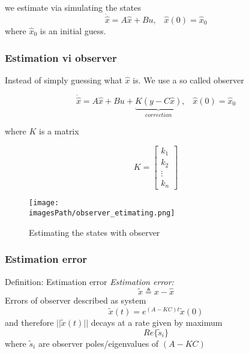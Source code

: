 \documentclass{article}
\newcommand{\imagesPath}{images}
\begin{document}
we estimate via simulating the states
\begin{equation*}
    \dot{\hat{x}} = A\hat{x} + Bu, \;\;\; \hat{x}(0) = \hat{x}_0
\end{equation*}
where $\hat{x}_0$ is an initial guess.

\subsubsection{Estimation vi observer}
Instead of simply guessing what $\hat{x}$ is. 
We use a so called observer

\begin{equation*}
    \dot{\hat{x}} = A\hat{x} + Bu + \underbrace{K(y-C\hat{x})}_{correction}, \;\;\; \hat{x}(0) = \hat{x}_0
\end{equation*}

where $K$ is a matrix

\begin{equation*}
    K = \begin{bmatrix} k_1 \\ k_2 \\ \vdots \\ k_n \end{bmatrix}
\end{equation*}

\begin{figure}[!h]
    \centering
    \texttt{[image: \\imagesPath/observer\_etimating.png]}
    \caption{Estimating the states with observer}
\end{figure}

\subsubsection{Estimation error}
\begin{definitionblock}{Definition: Estimation error}
    \textit{Estimation error:}
    \begin{equation*}
        \tilde{x} \triangleq x-\hat{x}
    \end{equation*}
    Errors of observer described as system 
    \begin{equation*}
        \tilde{x}(t) = e^{(A-KC)t}\tilde{x}(0)
    \end{equation*}
    and therefore $||\tilde{x}(t)||$ decays at a rate given by maximum
    \begin{equation*}
        Re\{\tilde{s}_i\}
    \end{equation*}
    where $\tilde{s}_i$ are observer poles/eigenvalues of $(A-KC)$ 
\end{definitionblock}
\end{document}
